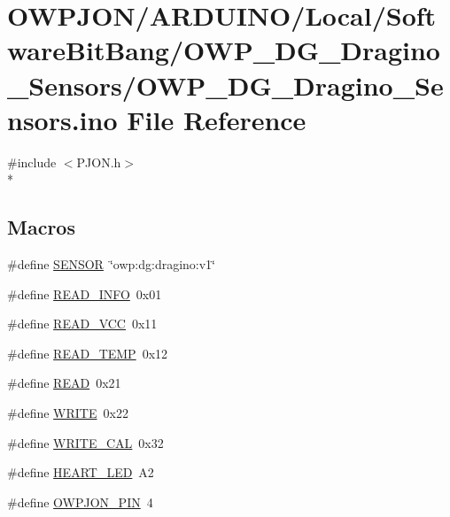 \hypertarget{OWP__DG__Dragino__Sensors_8ino}{\section{O\-W\-P\-J\-O\-N/\-A\-R\-D\-U\-I\-N\-O/\-Local/\-Software\-Bit\-Bang/\-O\-W\-P\-\_\-\-D\-G\-\_\-\-Dragino\-\_\-\-Sensors/\-O\-W\-P\-\_\-\-D\-G\-\_\-\-Dragino\-\_\-\-Sensors.ino File Reference}
\label{OWP__DG__Dragino__Sensors_8ino}
}
{\ttfamily \#include $<$P\-J\-O\-N.\-h$>$}\\*
\subsection*{Macros}
\begin{DoxyCompactItemize}
\item 
\#define \hyperlink{OWP__DG__Dragino__Sensors_8ino_a84f1ead330bbcc83a63929c4726080d7}{S\-E\-N\-S\-O\-R}~\char`\"{}owp\-:dg\-:dragino\-:v1\char`\"{}
\item 
\#define \hyperlink{OWP__DG__Dragino__Sensors_8ino_ae9d85efda88bdfdba5ca9fe92f557dd9}{R\-E\-A\-D\-\_\-\-I\-N\-F\-O}~0x01
\item 
\#define \hyperlink{OWP__DG__Dragino__Sensors_8ino_a3563b296d5f60635a1256e8a12261d74}{R\-E\-A\-D\-\_\-\-V\-C\-C}~0x11
\item 
\#define \hyperlink{OWP__DG__Dragino__Sensors_8ino_ac8c23082885adeec4834469b64e00bb9}{R\-E\-A\-D\-\_\-\-T\-E\-M\-P}~0x12
\item 
\#define \hyperlink{OWP__DG__Dragino__Sensors_8ino_ada74e7db007a68e763f20c17f2985356}{R\-E\-A\-D}~0x21
\item 
\#define \hyperlink{OWP__DG__Dragino__Sensors_8ino_aa10f470e996d0f51210d24f442d25e1e}{W\-R\-I\-T\-E}~0x22
\item 
\#define \hyperlink{OWP__DG__Dragino__Sensors_8ino_a9418b096dba157494f523dc01b82a760}{W\-R\-I\-T\-E\-\_\-\-C\-A\-L}~0x32
\item 
\#define \hyperlink{OWP__DG__Dragino__Sensors_8ino_ab5e96fdebe625793e8ec86ab6b5d9043}{H\-E\-A\-R\-T\-\_\-\-L\-E\-D}~A2
\item 
\#define \hyperlink{OWP__DG__Dragino__Sensors_8ino_a34fea28a7531677453da5e072f172a78}{O\-W\-P\-J\-O\-N\-\_\-\-P\-I\-N}~4
\end{DoxyCompactItemize}
